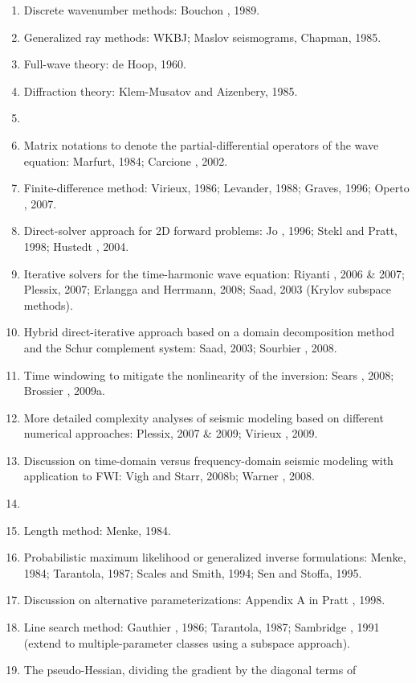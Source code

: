 \begin{enumerate}[\hspace{10mm}*]
  \item Discrete wavenumber methods: Bouchon \etal, 1989.
  \item Generalized ray methods: WKBJ; Maslov seismograms, Chapman, 1985.
  \item Full-wave theory: de Hoop, 1960.
  \item Diffraction theory: Klem-Musatov and Aizenbery, 1985.
  \item \sline
  \item Matrix notations to denote the partial-differential operators
    of the wave equation: Marfurt, 1984; Carcione \etal, 2002.
  \item Finite-difference method: Virieux, 1986; Levander, 1988;
    Graves, 1996; Operto \etal, 2007.
  \item Direct-solver approach for 2D forward problems:
    Jo \etal, 1996; Stekl and Pratt, 1998; Hustedt \etal, 2004.
  \item Iterative solvers for the time-harmonic wave equation:
    Riyanti \etal, 2006 \& 2007; Plessix, 2007;
    Erlangga and Herrmann, 2008; Saad, 2003 (Krylov subspace methods).
  \item Hybrid direct-iterative approach based on
    a domain decomposition method and the Schur complement system:
    Saad, 2003; Sourbier \etal, 2008.
  \item Time windowing to mitigate the nonlinearity of the inversion:
    Sears \etal, 2008; Brossier \etal, 2009a.
  \item More detailed complexity analyses of seismic modeling
    based on different numerical approaches:
    Plessix, 2007 \& 2009; Virieux \etal, 2009.
  \item Discussion on time-domain versus frequency-domain
    seismic modeling with application to FWI:
    Vigh and Starr, 2008b; Warner \etal, 2008.
  \item \sline
  \item Length method: Menke, 1984.
  \item Probabilistic maximum likelihood or generalized inverse formulations:
    Menke, 1984; Tarantola, 1987; Scales and Smith, 1994; Sen and Stoffa, 1995.
  \item Discussion on alternative parameterizations:
    Appendix A in Pratt \etal, 1998.
  \item Line search method: Gauthier \etal, 1986; Tarantola, 1987;
    Sambridge \etal, 1991 (extend to multiple-parameter classes
    using a subspace approach).
  \item The pseudo-Hessian, dividing the gradient by the diagonal terms of

\end{enumerate}
